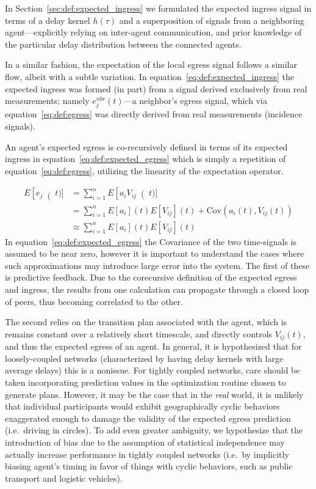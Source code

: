 \documentclass{report}
\begin{document}
In Section~\ref{sec:def:expected_ingress} we formulated the expected ingress signal in terms of a delay kernel $h(\tau)$ and a superposition of signals from a neighboring agent---explicitly relying on inter-agent communication, and prior knowledge of the particular delay distribution between the connected agents.

In a similar fashion, the expectation of the local egress signal follows a similar flow, albeit with a subtle variation.
In equation~\eqref{eq:def:expected_ingress} the expected ingress was formed (in part) from a signal derived exclusively from real measurements; namely $e^{nbr}_j(t)$---a neighbor's egress signal, which via equation~\eqref{eq:def:egress} was directly derived from real measurements (incidence signals).

An agent's expected egress is co-recursively defined in terms of its expected ingress in equation~\eqref{eq:def:expected_egress} which is simply a repetition of equation~\eqref{eq:def:egress}, utilizing the linearity of the expectation operator.


\begin{align}\label{eq:def:expected_egress}
	E\left[e_j\right(t)] &= \sum_{i=1}^n E\left[a_i V_{ij}\right(t)]\\
						&= \sum_{i=1}^n E\left[a_i\right](t) E\left[V_{ij}\right](t) + \mbox{Cov}(a_i(t), V_{ij}(t))\\
						&\approx \sum_{i=1}^n  E\left[a_i\right](t) E\left[V_{ij}\right](t)
\end{align}
In equation~\eqref{eq:def:expected_egress} the Covariance of the two time-signals is assumed to be near zero, however it is important to understand the cases where such approximations may introduce large error into the system.
The first of these is predictive feedback.
Due to the corecursive definition of the expected egress and ingress, the results from one calculation can propagate through a closed loop of peers, thus becoming correlated to the other.

The second relies on the transition plan associated with the agent, which is remains constant over a relatively short timescale, and directly controls $V_{ij}(t)$, and thus the expected egress of an agent.
In general, it is hypothesized that for loosely-coupled networks (characterized by having delay kernels with large average delays) this is a nonissue.
For tightly coupled networks, care should be taken incorporating prediction values in the optimization routine chosen to generate plans.
However, it may be the case that in the \emph{real} world, it is unlikely that individual participants would exhibit geographically cyclic behaviors exaggerated enough to damage the validity of the expected egress prediction (i.e.\ driving in circles).
To add even greater ambiguity, we hypothesize that the introduction of bias due to the assumption of statistical independence may actually increase performance in tightly coupled networks (i.e.\ by implicitly biasing agent's timing in favor of things with cyclic behaviors, such as public transport and logistic vehicles).
\end{document}
